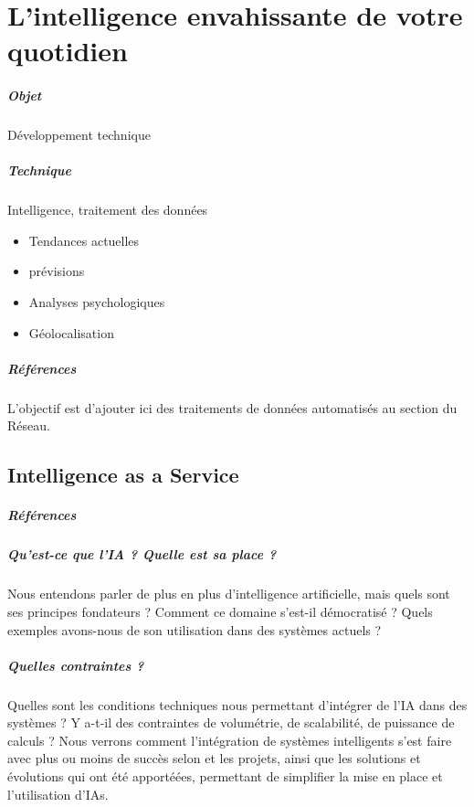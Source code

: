 \chapter{L'intelligence envahissante de votre quotidien}
\paragraph{Objet} Développement technique
\paragraph{Technique} Intelligence, traitement des données
\begin{itemize}
    \item Tendances actuelles
    \item prévisions
    \item Analyses psychologiques
    \item Géolocalisation
\end{itemize}

\paragraph{Références}
\cite{Asimov:0}
\cite{Moore:0}
\cite{MachineLearning:0}
\cite{MachineLearning:1}
\cite{ProgrammableCity:0}
\cite{ProgrammableCity:1}
\cite{GhostInTheShell}
\cite{PsychoPass}

L'objectif est d'ajouter ici des traitements de données automatisés au section
du Réseau. 

\section{Intelligence as a Service}
\paragraph{Références} 

\paragraph{Qu'est-ce que l'IA ? Quelle est sa place ?} Nous entendons parler
de plus en plus d'intelligence artificielle, mais quels sont ses principes
fondateurs ? Comment ce domaine s'est-il démocratisé ? Quels exemples avons-nous
de son utilisation dans des systèmes actuels ? 

\paragraph{Quelles contraintes ?} Quelles sont les conditions techniques nous
permettant d'intégrer de l'IA dans des systèmes ? Y a-t-il des contraintes de
volumétrie, de scalabilité, de puissance de calculs ? Nous verrons comment
l'intégration de systèmes intelligents s'est faire avec plus ou moins de succès
selon et les projets, ainsi que les solutions et évolutions qui ont été apportéées,
permettant de simplifier la mise en place et l'utilisation d'IAs. 

